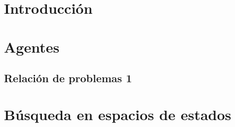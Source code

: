 \documentclass[a4paper,12pt]{book}
\begin{document}
\chapter{Introducción}


\chapter{Agentes}

\section{Relación de problemas 1}


\chapter{Búsqueda en espacios de estados}





\end{document}
